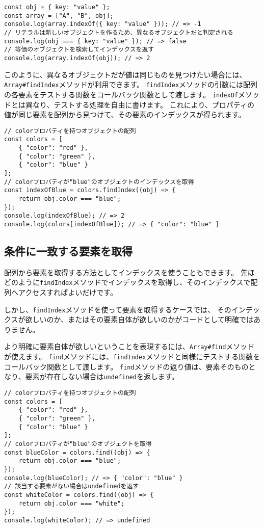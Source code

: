 \begin{lstlisting}
const obj = { key: "value" };
const array = ["A", "B", obj];
console.log(array.indexOf({ key: "value" })); // => -1
// リテラルは新しいオブジェクトを作るため、異なるオブジェクトだと判定される
console.log(obj === { key: "value" }); // => false
// 等価のオブジェクトを検索してインデックスを返す
console.log(array.indexOf(obj)); // => 2
\end{lstlisting}

このように、異なるオブジェクトだが値は同じものを見つけたい場合には、\texttt{Array\#findIndex}メソッドが利用できます。
\texttt{findIndex}メソッドの引数には配列の各要素をテストする関数をコールバック関数として渡します。
\texttt{indexOf}メソッドとは異なり、テストする処理を自由に書けます。
これにより、プロパティの値が同じ要素を配列から見つけて、その要素のインデックスが得られます。

\begin{lstlisting}
// colorプロパティを持つオブジェクトの配列
const colors = [
    { "color": "red" },
    { "color": "green" },
    { "color": "blue" }
];
// colorプロパティが"blue"のオブジェクトのインデックスを取得
const indexOfBlue = colors.findIndex((obj) => {
    return obj.color === "blue";
});
console.log(indexOfBlue); // => 2
console.log(colors[indexOfBlue]); // => { "color": "blue" }
\end{lstlisting}

\hypertarget{find}{%
\subsection{条件に一致する要素を取得}\label{find}}

配列から要素を取得する方法としてインデックスを使うこともできます。
先ほどのように\texttt{findIndex}メソッドでインデックスを取得し、そのインデックスで配列へアクセスすればよいだけです。

しかし、\texttt{findIndex}メソッドを使って要素を取得するケースでは、
そのインデックスが欲しいのか、またはその要素自体が欲しいのかがコードとして明確ではありません。

より明確に要素自体が欲しいということを表現するには、\texttt{Array\#find}メソッド\protect{}が使えます。
\texttt{find}メソッドには、\texttt{findIndex}メソッドと同様にテストする関数をコールバック関数として渡します。
\texttt{find}メソッドの返り値は、要素そのものとなり、要素が存在しない場合は\texttt{undefined}を返します。

\begin{lstlisting}
// colorプロパティを持つオブジェクトの配列
const colors = [
    { "color": "red" },
    { "color": "green" },
    { "color": "blue" }
];
// colorプロパティが"blue"のオブジェクトを取得
const blueColor = colors.find((obj) => {
    return obj.color === "blue";
});
console.log(blueColor); // => { "color": "blue" }
// 該当する要素がない場合はundefinedを返す
const whiteColor = colors.find((obj) => {
    return obj.color === "white";
});
console.log(whiteColor); // => undefined
\end{lstlisting}


